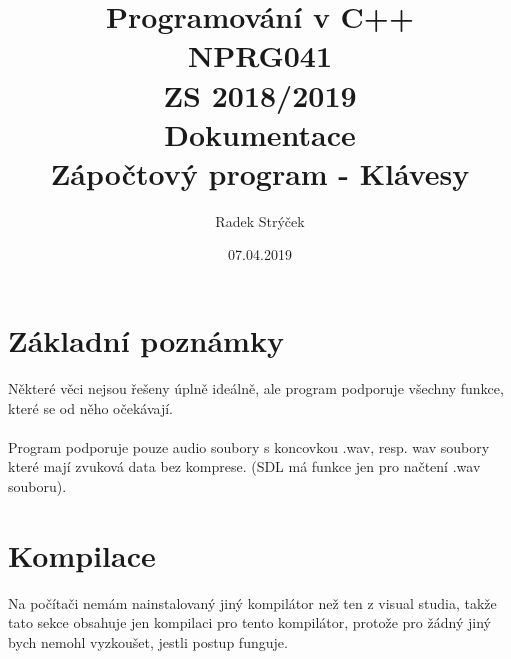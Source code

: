 \documentclass[12pt]{article}
\title{Programování v C++ \\ NPRG041 \\ ZS 2018/2019 \\ Dokumentace \\ Zápočtový program - Klávesy}
\author{Radek Strýček}
\date{07.04.2019}
\begin{document}
	
	\maketitle\section{Základní poznámky}
	Některé věci nejsou řešeny úplně ideálně, ale program podporuje všechny funkce, které se od něho očekávají.
	\\
	\\
	Program podporuje pouze audio soubory s koncovkou .wav, resp. wav soubory které mají zvuková data bez komprese. (SDL má funkce jen pro načtení .wav souboru).
	
	
	\newpage
	\maketitle\section{Kompilace}
	Na počítači nemám nainstalovaný jiný kompilátor než ten z visual studia, takže tato sekce obsahuje jen kompilaci pro tento kompilátor, protože pro žádný jiný bych nemohl vyzkoušet, jestli postup funguje.
	
	\newpage
\end{document}

